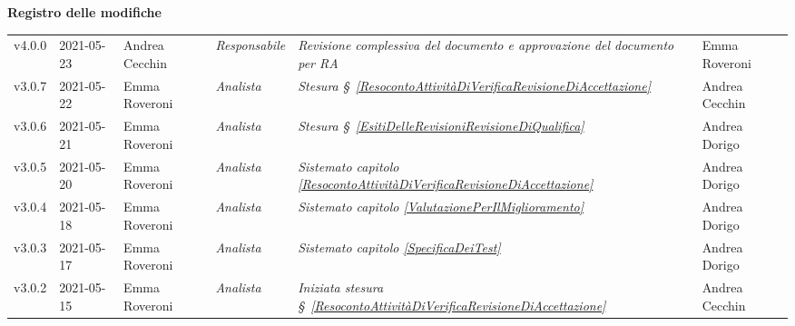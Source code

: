 \quad
\begin{center}
	\LARGE\textbf{Registro delle modifiche}
\end{center}

\def\tabularxcolumn#1{m{#1}}
{
\begin{center}
	\renewcommand{\arraystretch}{1.4}
	\begin{longtable}[c]{|p{2cm-1\tabcolsep}|p{2cm}|p{}|p{}|p{}|p{4cm-2\tabcolsep}|}
		\hline
		\rowcolor{airforceblue}
		\makecell[tc]{\textbf{Versione}} & \makecell[tc]{\textbf{Data}} & \makecell[tc]{\textbf{Autore}} & \makecell[tc]{\textbf{Ruolo}} & \makecell[tc]{\textbf{Modifica}} & \makecell[tc]{\textbf{Verificatore}}\\
		\hline
		\centering v4.0.0 & 2021-05-23 & Andrea Cecchin & \centering\textit{Responsabile}  &  \textit{ Revisione complessiva del documento e approvazione del documento per RA} & Emma Roveroni \\
		\hline
		\centering v3.0.7 & 2021-05-22 & Emma Roveroni & \centering\textit{Analista}  &  \textit{ Stesura  \S~\ref{ResocontoAttivitàDiVerificaRevisioneDiAccettazione}} & Andrea Cecchin \\
		\hline
		\centering v3.0.6 & 2021-05-21 & Emma Roveroni & \centering\textit{Analista}  &  \textit{ Stesura  \S~\ref{EsitiDelleRevisioniRevisioneDiQualifica}} & Andrea Dorigo \\
		\hline
		\centering v3.0.5 & 2021-05-20 & Emma Roveroni & \centering\textit{Analista}  &  \textit{ Sistemato capitolo \ref{ResocontoAttivitàDiVerificaRevisioneDiAccettazione}} & Andrea Dorigo \\
		\hline
		\centering v3.0.4 & 2021-05-18 & Emma Roveroni & \centering\textit{Analista}  &  \textit{ Sistemato capitolo \ref{ValutazionePerIlMiglioramento}} & Andrea Dorigo \\
		\hline
		\centering v3.0.3 & 2021-05-17 & Emma Roveroni & \centering\textit{Analista}  &  \textit{ Sistemato capitolo \ref{SpecificaDeiTest}} & Andrea Dorigo \\
		\hline
		\centering v3.0.2 & 2021-05-15 & Emma Roveroni & \centering\textit{Analista}  &  \textit{Iniziata stesura \S~\ref{ResocontoAttivitàDiVerificaRevisioneDiAccettazione}} & Andrea Cecchin \\
		\hline
		

\end{longtable}
\end{center}}
